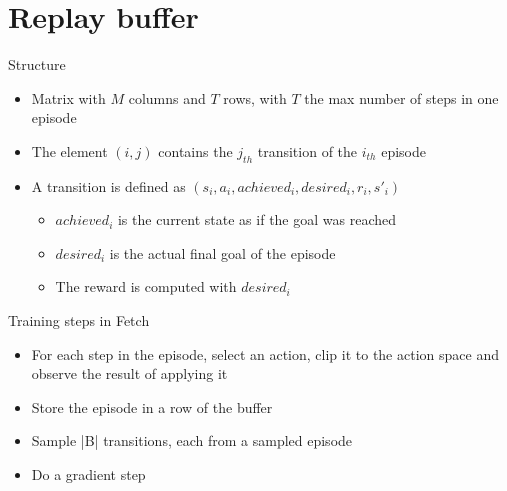 \documentclass{beamer}
\begin{document}
\section{Replay buffer}

      \begin{frame}{Structure}
            \begin{itemize}
                  \item Matrix with $M$ columns and $T$ rows, with $T$ the max number of steps in one episode
                  \item The element $(i,j)$ contains the $j_{th}$ transition of the $i_{th}$ episode
                  \item A transition is defined as $(s_i,a_i,achieved_i,desired_i,r_i,s'_i)$
                  \begin{itemize}
                        \item $achieved_i$ is the current state as if the goal was reached
                        \item $desired_i$ is the actual final goal of the episode
                        \item The reward is computed with $desired_i$
                  \end{itemize}
            \end{itemize}
            \begin{block}{Training steps in Fetch}
                  \begin{itemize}
                        \item For each step in the episode, select an action, clip it to the action space and observe the result of applying it
                        \item Store the episode in a row of the buffer
                        \item Sample |B| transitions, each from a sampled episode
                        \item Do a gradient step
                  \end{itemize}
            \end{block}

            
      \end{frame}
\end{document}
